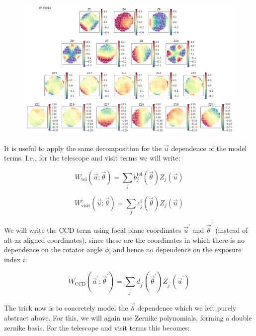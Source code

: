 \documentclass{article}
\begin{document}
\begin{figure}
    \includegraphics{a69016.png}

    \caption{}

    \label{fig:a69016}
\end{figure}

It is useful to apply the same decomposition for the $\vec{u}$ dependence of the
model terms.  I.e., for the telescope and visit terms we will write:

\begin{equation}
    W_\mathrm{tel}\left(\vec{u}; \vec{\theta}\right) =
    \sum_j b^\mathrm{tel}_j (\vec{\theta}) Z_j(\vec{u})
\end{equation}

\begin{equation}
    W^i_\mathrm{visit}\left(\vec{u}; \vec{\theta}\right) =
    \sum_j c^i_j (\vec{\theta}) Z_j(\vec{u})
\end{equation}

We will write the CCD term using focal plane coordinates $\vec{u}^\prime$ and
$\vec{\theta}^\prime$ (instead of alt-az aligned coordinates), since these are
the coordinates in which there is no dependence on the rotator angle $\phi$, and
hence no dependence on the exposure index $i$:

\begin{equation}
    W^\prime_\mathrm{CCD}\left(\vec{u}^\prime; \vec{\theta}^\prime\right) =
    \sum_{j^\prime} d_{j^\prime} (\vec{\theta}^\prime) Z_{j^\prime}(\vec{u}^\prime)
\end{equation}

The trick now is to concretely model the $\vec{\theta}$ dependence which we left
purely abstract above.  For this, we will again use Zernike polynomials, forming
a double zernike basis.  For the telescope and visit terms this becomes:
\end{document}
